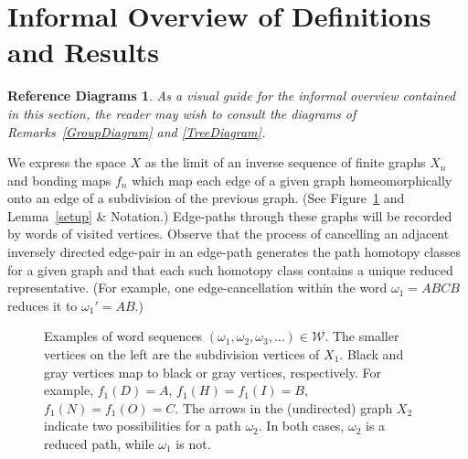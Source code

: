 \documentclass{amsart}
\theoremstyle{definition}
\newtheorem*{RefDiag}{Reference Diagrams}
\theoremstyle{remark}
\numberwithin{equation}{section}
\begin{document}
\section{Informal Overview of Definitions and Results}

 \begin{RefDiag} {\sl As a visual guide for the informal overview contained in this section, the reader may wish to consult the diagrams of Remarks~\ref{GroupDiagram} and \ref{TreeDiagram}.}
\end{RefDiag}

We express the  space $X$ as the limit of an inverse sequence of finite graphs $X_n$ and bonding maps $f_n$ which map each edge of a given graph homeomorphically onto an edge of a subdivision of the previous graph. (See Figure~\ref{example} and Lemma~\ref{setup} \& Notation.)
 Edge-paths through these graphs will be recorded by words of visited vertices. Observe that the process of cancelling an adjacent inversely directed edge-pair in an edge-path generates the path homotopy classes for a given graph and that each such homotopy class contains a unique reduced representative.
 (For example, one edge-cancellation within the word $\omega_1=ABCB$ reduces it to $\omega_1'=AB$.)
\begin{figure}[h!]
\caption{\label{example}  Examples of word sequences $(\omega_1,\omega_2,\omega_3,\ldots)\in {\mathcal W}$. The smaller vertices on the left are the subdivision vertices of $X_1$. Black and gray vertices map to black or gray vertices, respectively. For example, $f_1(D)=A$, $f_1(H)=f_1(I)=B$, $f_1(N)=f_1(O)=C$. The arrows in the (undirected) graph $X_2$ indicate two possibilities for a path $\omega_2$.
 In both cases, $\omega_2$ is a reduced path, while $\omega_1$ is not.}
\end{figure}
\end{document}
